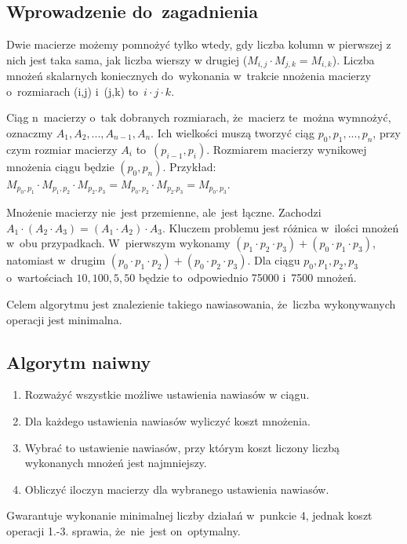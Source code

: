 \vspace{0.4cm}

\subsection{Wprowadzenie do~zagadnienia}
Dwie macierze możemy pomnożyć tylko wtedy, gdy liczba kolumn w pierwszej z nich jest taka sama, jak liczba wierszy w drugiej ($M_{i,j} \cdot M_{j,k} = M_{i,k}$). Liczba mnożeń skalarnych koniecznych do~wykonania w~trakcie nnożenia macierzy o~rozmiarach (i,j) i~(j,k) to~$i \cdot j \cdot k$.

Ciąg n~macierzy o~tak dobranych rozmiarach, że~macierz te~można wymnożyć, oznaczmy $A_1,A_2,...,A_{n-1},A_n$. Ich wielkości muszą tworzyć ciąg $p_0,p_1,...,p_n$, przy czym rozmiar macierzy $A_i$ to~$(p_{i-1},p_i)$. Rozmiarem macierzy wynikowej mnożenia ciągu będzie $(p_0,p_n)$. Przykład: $M_{p_0,p_1} \cdot M_{p_1,p_2} \cdot M_{p_2,p_3} = M_{p_0,p_2} \cdot M_{p_2.p_3} = M_{p_0,p_3}$.

Mnożenie macierzy nie~jest przemienne, ale~jest łączne. Zachodzi $A_1 \cdot (A_2 \cdot A_3) = (A_1 \cdot A_2) \cdot A_3$. Kluczem problemu jest różnica w~ilości mnożeń w~obu przypadkach. W~pierwszym wykonamy $(p_1 \cdot p_2 \cdot p_3) + (p_0 \cdot p_1 \cdot p_3)$, natomiast w~drugim $(p_0 \cdot p_1 \cdot p_2) + (p_0 \cdot p_2 \cdot p_3)$. Dla ciągu $p_0,p_1,p_2,p_3$ o~wartościach $10,100,5,50$ będzie to~odpowiednio 75000 i~7500 mnożeń.

Celem algorytmu jest znalezienie takiego nawiasowania, że~liczba wykonywanych operacji jest minimalna.

\subsection{Algorytm naiwny}

\begin{enumerate}
	\item Rozważyć wszystkie możliwe ustawienia nawiasów w ciągu.
	\item Dla każdego ustawienia nawiasów wyliczyć koszt mnożenia.
	\item Wybrać to ustawienie nawiasów, przy którym koszt liczony liczbą wykonanych mnożeń jest najmniejszy.
	\item Obliczyć iloczyn macierzy dla wybranego ustawienia nawiasów.
\end{enumerate}
Gwarantuje wykonanie minimalnej liczby działań w~punkcie 4, jednak koszt operacji 1.-3. sprawia, że~nie~jest on~optymalny.

